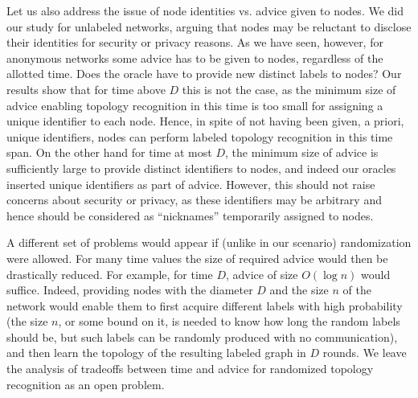 \documentclass{article}
\begin{document}
Let us also address the issue of node identities vs. advice given to nodes.
We did our study for unlabeled networks, arguing that nodes may be reluctant to disclose their identities for security or privacy reasons.
As we have seen, however, for anonymous networks some advice has to be given to nodes, regardless of the allotted time.
Does the oracle have to provide new distinct labels to nodes?
Our results show that for time above $D$ this is not the case, as the minimum size of advice enabling topology recognition in this time is too small for assigning a unique identifier to each node.
Hence, in spite of not having been given, a priori, unique identifiers, nodes can perform labeled topology recognition in this time span.
On the other hand for time at most $D$, the minimum size of advice is sufficiently large to provide distinct identifiers to nodes, and indeed our oracles inserted unique identifiers as part of advice. However, this should not raise concerns about security or privacy, as these identifiers may be arbitrary and hence should be considered as ``nicknames'' temporarily assigned to nodes. 

A different set of problems would appear if (unlike in our scenario) randomization were allowed. For many time values the size of required advice
would then be drastically reduced. For example, for time $D$, advice of size $O(\log n)$ would suffice. Indeed, providing nodes with
 the diameter $D$ and the size $n$ of the network would enable them to first acquire
different labels with high probability (the size $n$, or some bound on it, is needed to know how long the random labels should be, but such labels can be
randomly produced with no communication),
and then learn the topology of the resulting labeled graph in $D$ rounds. We leave the analysis of tradeoffs between time and advice for randomized topology 
recognition as an open problem.  
 
\end{document}
